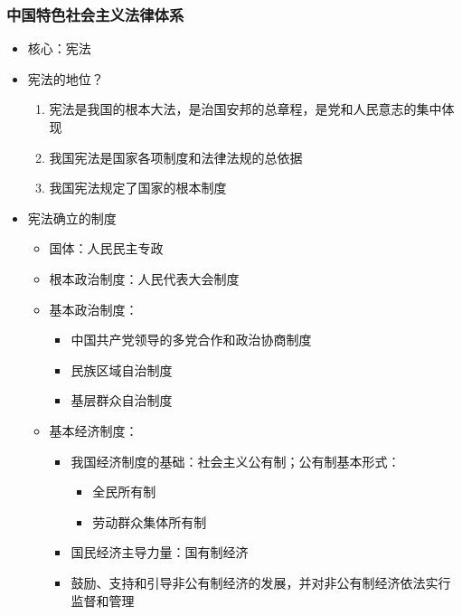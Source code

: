 \hypertarget{ux4e2dux56fdux7279ux8272ux793eux4f1aux4e3bux4e49ux6cd5ux5f8bux4f53ux7cfb}{%
\subsubsection{中国特色社会主义法律体系}\label{ux4e2dux56fdux7279ux8272ux793eux4f1aux4e3bux4e49ux6cd5ux5f8bux4f53ux7cfb}}

\begin{itemize}
\tightlist
\item
  核心：宪法
\item
  宪法的地位？

  \begin{enumerate}
  \def\labelenumi{\arabic{enumi}.}
  \tightlist
  \item
    宪法是我国的根本大法，是治国安邦的总章程，是党和人民意志的集中体现
  \item
    我国宪法是国家各项制度和法律法规的总依据
  \item
    我国宪法规定了国家的根本制度
  \end{enumerate}
\item
  宪法确立的制度

  \begin{itemize}
  \tightlist
  \item
    国体：人民民主专政
  \item
    根本政治制度：人民代表大会制度
  \item
    基本政治制度：

    \begin{itemize}
    \tightlist
    \item
      中国共产党领导的多党合作和政治协商制度
    \item
      民族区域自治制度
    \item
      基层群众自治制度
    \end{itemize}
  \item
    基本经济制度：

    \begin{itemize}
    \tightlist
    \item
      我国经济制度的基础：社会主义公有制；公有制基本形式：

      \begin{itemize}
      \tightlist
      \item
        全民所有制
      \item
        劳动群众集体所有制
      \end{itemize}
    \item
      国民经济主导力量：国有制经济
    \item
      鼓励、支持和引导非公有制经济的发展，并对非公有制经济依法实行监督和管理
    \end{itemize}
  \end{itemize}
\end{itemize}

